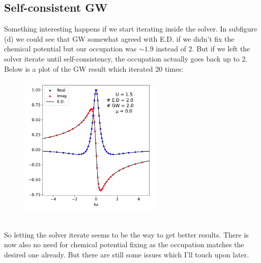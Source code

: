\documentclass[12pt]{article}
\begin{document}
\subsection*{Self-consistent GW}
Something interesting happens if we start iterating inside the solver. In subfigure (d) we could see that GW somewhat agreed with E.D. if we didn't fix the chemical potential but our occupation was $\sim 1.9$ instead of 2. But if we left the solver iterate until self-consistency, the occupation actually goes back up to 2. Below is a plot of the GW result which iterated 20 times:
\begin{figure}[h!]
\centering
\includegraphics[width=0.6\textwidth]{sc2.pdf}
\end{figure}\\
So letting the solver iterate seems to be the way to get better results. There is now also no need for chemical potential fixing as the occupation matches the desired one already. But there are still some issues which I'll touch upon later.
\newpage
\noindent
\end{document}
